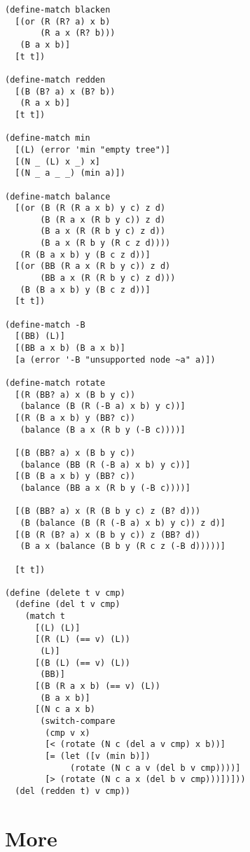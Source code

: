 \documentclass[preprint]{sigplanconf}
\begin{document}
\begin{verbatim}
(define-match blacken
  [(or (R (R? a) x b)
       (R a x (R? b)))
   (B a x b)]
  [t t])

(define-match redden
  [(B (B? a) x (B? b))
   (R a x b)]
  [t t])

(define-match min
  [(L) (error 'min "empty tree")]
  [(N _ (L) x _) x]
  [(N _ a _ _) (min a)])

(define-match balance
  [(or (B (R (R a x b) y c) z d)
       (B (R a x (R b y c)) z d)
       (B a x (R (R b y c) z d))
       (B a x (R b y (R c z d))))
   (R (B a x b) y (B c z d))]
  [(or (BB (R a x (R b y c)) z d)
       (BB a x (R (R b y c) z d)))
   (B (B a x b) y (B c z d))]
  [t t])

(define-match -B
  [(BB) (L)]
  [(BB a x b) (B a x b)]
  [a (error '-B "unsupported node ~a" a)])

(define-match rotate
  [(R (BB? a) x (B b y c))
   (balance (B (R (-B a) x b) y c))]
  [(R (B a x b) y (BB? c))
   (balance (B a x (R b y (-B c))))]
    
  [(B (BB? a) x (B b y c))
   (balance (BB (R (-B a) x b) y c))]
  [(B (B a x b) y (BB? c))
   (balance (BB a x (R b y (-B c))))]
    
  [(B (BB? a) x (R (B b y c) z (B? d)))
   (B (balance (B (R (-B a) x b) y c)) z d)]
  [(B (R (B? a) x (B b y c)) z (BB? d))
   (B a x (balance (B b y (R c z (-B d)))))]
    
  [t t])

(define (delete t v cmp)
  (define (del t v cmp)
    (match t
      [(L) (L)]
      [(R (L) (== v) (L))
       (L)]
      [(B (L) (== v) (L))
       (BB)]
      [(B (R a x b) (== v) (L))
       (B a x b)]
      [(N c a x b)
       (switch-compare
        (cmp v x)
        [< (rotate (N c (del a v cmp) x b))]
        [= (let ([v (min b)])
             (rotate (N c a v (del b v cmp))))]
        [> (rotate (N c a x (del b v cmp)))])]))
  (del (redden t) v cmp))
\end{verbatim}

\section{More}
\end{document}
